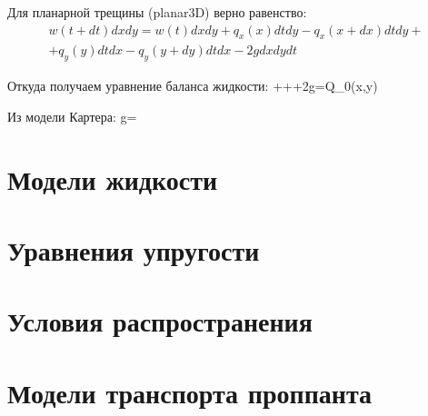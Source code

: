Для планарной трещины (planar3D) верно равенство:
\begin{multline}
w(t+dt)dxdy = w(t)dxdy+q_x(x)dtdy-q_x(x+dx)dtdy+\\+q_y(y)dtdx-q_y(y+dy)dtdx-2gdxdydt
\end{multline}

Откуда получаем уравнение баланса жидкости:
\beq
{}+++2g=Q_0\delta(x,y)
\eeq

Из модели Картера:
\beq
g=
\eeq


\section{Модели жидкости}

\section{Уравнения упругости}

\section{Условия распространения}

\section{Модели транспорта проппанта}








